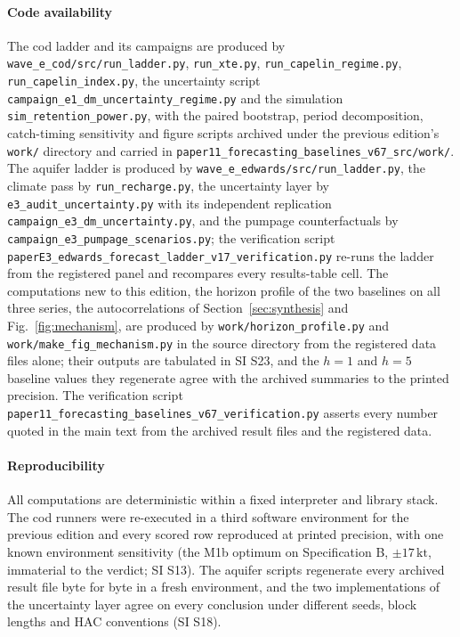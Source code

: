 \documentclass[preprint,11pt,authoryear]{elsarticle}
\theoremstyle{definition}
\theoremstyle{remark}
\newcommand{\kt}{\,\mathrm{kt}}
\begin{document}
\paragraph{Code availability} The cod ladder and its campaigns are produced by \texttt{wave\_e\_cod/src/run\_ladder.py}, \texttt{run\_xte.py}, \texttt{run\_capelin\_regime.py}, \texttt{run\_capelin\_index.py}, the uncertainty script \texttt{campaign\_e1\_dm\_uncertainty\_regime.py} and the simulation \texttt{sim\_retention\_power.py}, with the paired bootstrap, period decomposition, catch-timing sensitivity and figure scripts archived under the previous edition's \texttt{work/} directory and carried in \texttt{paper11\_forecasting\_baselines\_v67\_src/work/}. The aquifer ladder is produced by \texttt{wave\_e\_edwards/src/run\_ladder.py}, the climate pass by \texttt{run\_recharge.py}, the uncertainty layer by \texttt{e3\_audit\_uncertainty.py} with its independent replication \texttt{campaign\_e3\_dm\_uncertainty.py}, and the pumpage counterfactuals by \texttt{campaign\_e3\_pumpage\_scenarios.py}; the verification script \texttt{paperE3\_edwards\_forecast\_ladder\_v17\_verification.py} re-runs the ladder from the registered panel and recompares every results-table cell. The computations new to this edition, the horizon profile of the two baselines on all three series, the autocorrelations of Section~\ref{sec:synthesis} and Fig.~\ref{fig:mechanism}, are produced by \texttt{work/horizon\_profile.py} and \texttt{work/make\_fig\_mechanism.py} in the source directory from the registered data files alone; their outputs are tabulated in SI S23, and the $h=1$ and $h=5$ baseline values they regenerate agree with the archived summaries to the printed precision. The verification script \texttt{paper11\_forecasting\_baselines\_v67\_verification.py} asserts every number quoted in the main text from the archived result files and the registered data.

\paragraph{Reproducibility} All computations are deterministic within a fixed interpreter and library stack. The cod runners were re-executed in a third software environment for the previous edition and every scored row reproduced at printed precision, with one known environment sensitivity (the M1b optimum on Specification B, $\pm17\kt$, immaterial to the verdict; SI S13). The aquifer scripts regenerate every archived result file byte for byte in a fresh environment, and the two implementations of the uncertainty layer agree on every conclusion under different seeds, block lengths and HAC conventions (SI S18).
\end{document}
